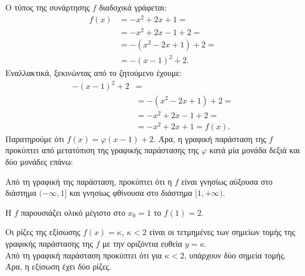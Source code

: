 \begin{alist}
\item Ο τύπος της συνάρτησης $f$ διαδοχικά γράφεται:
\begin{align*}
f(x) &= -x^2 + 2x + 1 = \\
&= -x^2 + 2x - 1 + 2 = \\
&= -(x^2 - 2x + 1) + 2 = \\
&= -(x - 1)^2 + 2.
\end{align*}
Εναλλακτικά, ξεκινώντας από το ζητούμενο έχουμε:
\begin{align*}
-(x - 1)^2 + 2 &= \\
&= -(x^2 - 2x + 1) + 2 = \\
&= -x^2 + 2x - 1 + 2 = \\
&= -x^2 + 2x + 1 = f(x).
\end{align*}
Παρατηρούμε ότι $f(x) = \varphi(x - 1) + 2$. Άρα, η γραφική παράσταση της $f$ προκύπτει από μετατόπιση της γραφικής παράστασης της $\varphi$ κατά μία μονάδα δεξιά και δύο μονάδες επάνω:
\begin{center}
\end{center}
\item 
\begin{rlist}
\item Από τη γραφική της παράσταση, προκύπτει ότι η $f$ είναι γνησίως αύξουσα στο διάστημα $(-\infty, 1]$ και γνησίως φθίνουσα στο διάστημα $[1, +\infty)$.
\item Η $f$ παρουσιάζει ολικό μέγιστο στο $x_0 = 1$ το $f(1) = 2$.
\item Οι ρίζες της εξίσωσης $f(x) = \kappa$, $\kappa < 2$ είναι οι τετμημένες των σημείων τομής της γραφικής παράστασης της $f$ με την οριζόντια ευθεία $y = \kappa$. \\
Από τη γραφική παράσταση προκύπτει ότι για $\kappa < 2$, υπάρχουν δύο σημεία τομής. Άρα, η εξίσωση έχει δύο ρίζες.
\end{rlist}
\end{alist}

